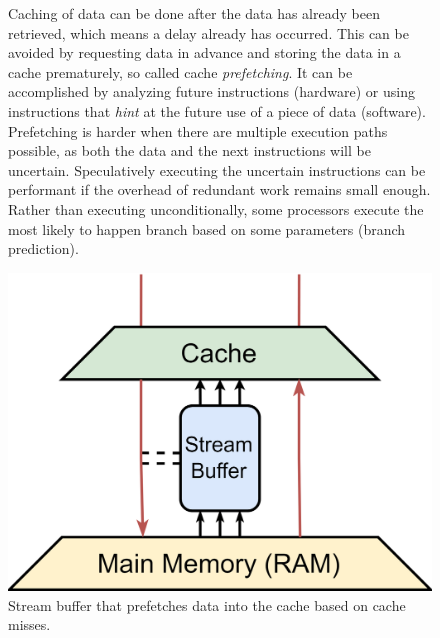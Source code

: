 \documentclass{article}
\begin{document}
\begin{figure}[ht]
\begin{minipage}{.65\textwidth}
Caching of data can be done after the data has already been retrieved, which means a delay already has occurred.
This can be avoided by requesting data in advance and storing the data in a cache prematurely, so called cache {\it prefetching}.
It can be accomplished by analyzing future instructions (hardware) or using instructions that {\it hint} at the future use of a piece of data (software)\cite{cache-prefetching}.
Prefetching is harder when there are multiple execution paths possible, as both the data and the next instructions will be uncertain.
Speculatively executing the uncertain instructions can be performant if the overhead of redundant work remains small enough.
Rather than executing unconditionally, some processors execute the most likely to happen branch based on some parameters (branch prediction)\cite{instruction-level-parallelism}.
\end{minipage}%
\begin{minipage}{.35\textwidth}
    \centering
    \includegraphics[scale=0.08]{Performance3.png}
    \captionsetup{margin=0.5cm}
    \captionsetup{format=plain}
    \caption{Stream buffer that prefetches data into the cache based on cache misses.}
\end{minipage}
\end{figure}
\vspace{-1.5em}
\end{document}
